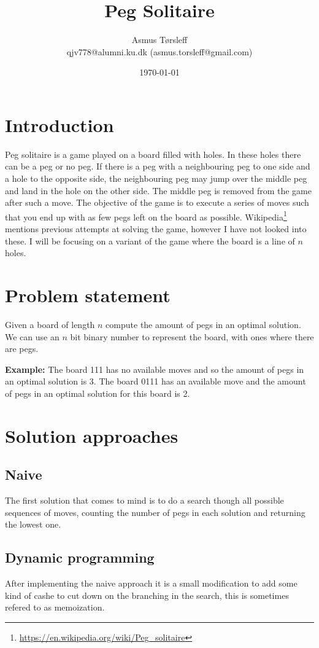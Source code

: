 \documentclass{article}
\title{Peg Solitaire}
\author{
\centering
\begin{tabular}{c}
    Asmus Tørsleff\\
    qjv778@alumni.ku.dk (asmus.torsleff@gmail.com)\\
\end{tabular}}
\date{\today}
\begin{document}
\maketitle
\section{Introduction}
Peg solitaire is a game played on a board filled with holes. In these holes there can be a peg or no peg. If there is a peg with a neighbouring peg to one side and a hole to the opposite side, the neighbouring peg may jump over the middle peg and land in the hole on the other side. The middle peg is removed from the game after such a move. The objective of the game is to execute a series of moves such that you end up with as few pegs left on the board as possible. Wikipedia\footnote{\url{https://en.wikipedia.org/wiki/Peg_solitaire}} mentions previous attempts at solving the game, however I have not looked into these. I will be focusing on a variant of the game where the board is a line of $n$ holes.
\section{Problem statement}
Given a board of length $n$ compute the amount of pegs in an optimal solution. 
We can use an $n$ bit binary number to represent the board, with ones where there are pegs. 


\textbf{Example:} The board 111 has no available moves and so the amount of pegs in an optimal solution is 3. The board 0111 has an available move and the amount of pegs in an optimal solution for this board is 2. 

\section{Solution approaches}

\subsection{Naive}
The first solution that comes to mind is to do a search though all possible sequences of moves, counting the number of pegs in each solution and returning the lowest one. 

\subsection{Dynamic programming}
After implementing the naive approach it is a small modification to add some kind of cashe to cut down on the branching in the search, this is sometimes refered to as memoization. 
\end{document}
